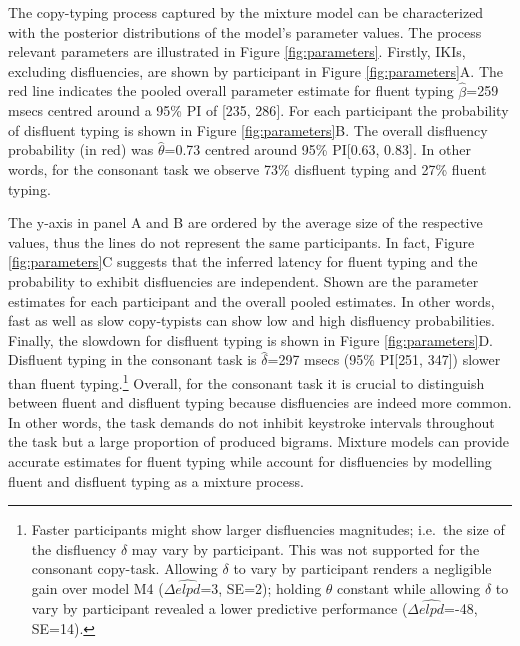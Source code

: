 \documentclass[english,man,floatsintext]{apa7}
\begin{document}
The copy-typing process captured by the mixture model can be characterized with the posterior distributions of the model's parameter values. The process relevant parameters are illustrated in Figure \ref{fig:parameters}. Firstly, IKIs, excluding disfluencies, are shown by participant in Figure \ref{fig:parameters}A. The red line indicates the pooled overall parameter estimate for fluent typing \(\hat{\beta}\)=259 msecs centred around a 95\% PI of {[}235, 286{]}. For each participant the probability of disfluent typing is shown in Figure \ref{fig:parameters}B. The overall disfluency probability (in red) was \(\hat{\theta}\)=0.73 centred around 95\% PI{[}0.63, 0.83{]}. In other words, for the consonant task we observe 73\% disfluent typing and 27\% fluent typing.

The y-axis in panel A and B are ordered by the average size of the respective values, thus the lines do not represent the same participants. In fact, Figure \ref{fig:parameters}C suggests that the inferred latency for fluent typing and the probability to exhibit disfluencies are independent. Shown are the parameter estimates for each participant and the overall pooled estimates. In other words, fast as well as slow copy-typists can show low and high disfluency probabilities. Finally, the slowdown for disfluent typing is shown in Figure \ref{fig:parameters}D. Disfluent typing in the consonant task is \(\hat{\delta}\)=297 msecs (95\% PI{[}251, 347{]}) slower than fluent typing.\footnote{Faster participants might show larger disfluencies magnitudes; i.e.~the size of the disfluency \(\delta\) may vary by participant. This was not supported for the consonant copy-task. Allowing \(\delta\) to vary by participant renders a negligible gain over model M4 (\(\Delta\widehat{elpd}\)=3, SE=2); holding \(\theta\) constant while allowing \(\delta\) to vary by participant revealed a lower predictive performance (\(\Delta\widehat{elpd}\)=-48, SE=14).} Overall, for the consonant task it is crucial to distinguish between fluent and disfluent typing because disfluencies are indeed more common. In other words, the task demands do not inhibit keystroke intervals throughout the task but a large proportion of produced bigrams. Mixture models can provide accurate estimates for fluent typing while account for disfluencies by modelling fluent and disfluent typing as a mixture process.
\end{document}
